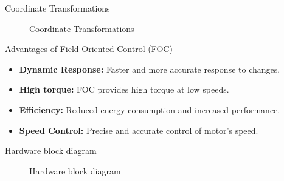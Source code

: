 \begin{frame}{Coordinate Transformations}
	\begin{figure}
		\centering
		\caption{Coordinate Transformations}
	\end{figure}
\end{frame}

\begin{frame}{Advantages of Field Oriented Control (FOC)}
	\begin{itemize}
		\item \textbf{Dynamic Response:} Faster and more accurate response to changes.
		\item \textbf{High torque:} FOC provides high torque at low speeds.
		\item \textbf{Efficiency:} Reduced energy consumption and increased performance.
		\item \textbf{Speed Control:} Precise and accurate control of motor's speed.
	\end{itemize}
\end{frame}




\begin{frame}{Hardware block diagram}
	\begin{figure}
		\centering


		\caption{Hardware block diagram}
	\end{figure}
\end{frame}


